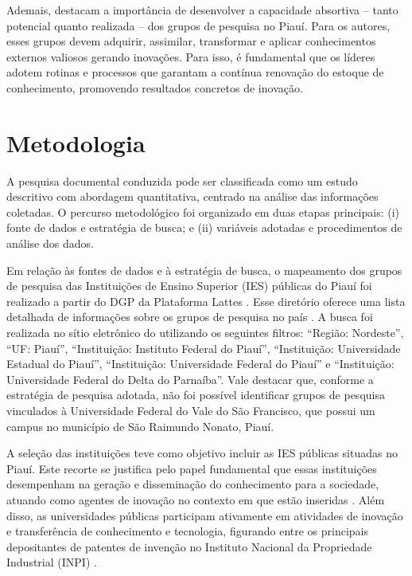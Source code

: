 \documentclass[portuguese]{textolivre}
\begin{document}
Ademais, \textcite{souza2024} destacam a importância de desenvolver a capacidade absortiva – tanto potencial quanto realizada – dos grupos de pesquisa no Piauí. Para os autores, esses grupos devem adquirir, assimilar, transformar e aplicar conhecimentos externos valiosos gerando inovações. Para isso, é fundamental que os líderes adotem rotinas e processos que garantam a contínua renovação do estoque de conhecimento, promovendo resultados concretos de inovação.

\section{Metodologia}\label{sec-fmt-manuscrito}
A pesquisa documental conduzida pode ser classificada como um estudo descritivo com abordagem quantitativa, centrado na análise das informações coletadas. O percurso metodológico foi organizado em duas etapas principais: (i) fonte de dados e estratégia de busca; e (ii) variáveis adotadas e procedimentos de análise dos dados.

Em relação às fontes de dados e à estratégia de busca, o mapeamento dos grupos de pesquisa das Instituições de Ensino Superior (IES) públicas do Piauí foi realizado a partir do DGP da Plataforma Lattes \cite{cnpq2023a}. Esse diretório oferece uma lista detalhada de informações sobre os grupos de pesquisa no país \cite{florencio2018}. A busca foi realizada no sítio eletrônico do \textcite{cnpq2023a} utilizando os seguintes filtros: “Região: Nordeste”, “UF: Piauí”, “Instituição: Instituto Federal do Piauí”, “Instituição: Universidade Estadual do Piauí”, “Instituição: Universidade Federal do Piauí” e “Instituição: Universidade Federal do Delta do Parnaíba”. Vale destacar que, conforme a estratégia de pesquisa adotada, não foi possível identificar grupos de pesquisa vinculados à Universidade Federal do Vale do São Francisco, que possui um campus no município de São Raimundo Nonato, Piauí.

A seleção das instituições teve como objetivo incluir as IES públicas situadas no Piauí. Este recorte se justifica pelo papel fundamental que essas instituições desempenham na geração e disseminação do conhecimento para a sociedade, atuando como agentes de inovação no contexto em que estão inseridas \cite{tosta2016}. Além disso, as universidades públicas participam ativamente em atividades de inovação e transferência de conhecimento e tecnologia, figurando entre os principais depositantes de patentes de invenção no Instituto Nacional da Propriedade Industrial (INPI) \cite{closs2012,inpi2020}.
\end{document}
